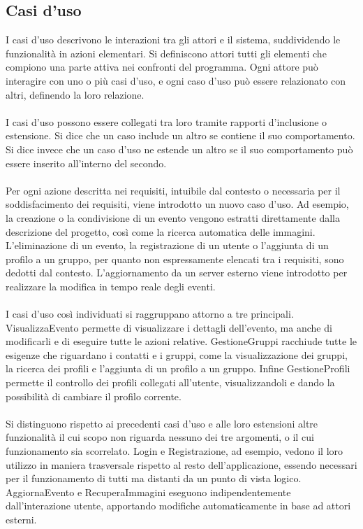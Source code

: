 \subsection{Casi d’uso}

I casi d’uso descrivono le interazioni tra gli attori e il sistema,
suddividendo le funzionalità in azioni elementari.
Si definiscono attori tutti gli elementi che compiono una parte attiva nei confronti del programma.
Ogni attore può interagire con uno o più casi d'uso,
e ogni caso d'uso può essere relazionato con altri, definendo la loro relazione.\\
\\
I casi d'uso possono essere collegati tra loro tramite rapporti d'inclusione o estensione.
Si dice che un caso include un altro se contiene il suo comportamento.
Si dice invece che un caso d'uso ne estende un altro se
il suo comportamento può essere inserito all'interno del secondo.\\
\\
Per ogni azione descritta nei requisiti, intuibile dal contesto o necessaria per il soddisfacimento dei requisiti,
viene introdotto un nuovo caso d'uso.
Ad esempio, la creazione o la condivisione di un evento
vengono estratti direttamente dalla descrizione del progetto,
così come la ricerca automatica delle immagini.
L'eliminazione di un evento, la registrazione di un utente o l'aggiunta di un profilo a un gruppo,
per quanto non espressamente elencati tra i requisiti,
sono dedotti dal contesto.
L'aggiornamento da un server esterno viene introdotto
per realizzare la modifica in tempo reale degli eventi.\\
\\
I casi d'uso così individuati si raggruppano attorno a tre principali.
VisualizzaEvento permette di visualizzare i dettagli dell'evento,
ma anche di modificarli e di eseguire tutte le azioni relative.
GestioneGruppi racchiude tutte le esigenze che riguardano i contatti e i gruppi,
come la visualizzazione dei gruppi, la ricerca dei profili e l'aggiunta di un profilo a un gruppo.
Infine GestioneProfili permette il controllo dei profili collegati all'utente,
visualizzandoli e dando la possibilità di cambiare il profilo corrente.\\
\\
Si distinguono rispetto ai precedenti casi d'uso e alle loro estensioni
altre funzionalità il cui scopo non riguarda nessuno dei tre argomenti,
o il cui funzionamento sia scorrelato.
Login e Registrazione, ad esempio,
vedono il loro utilizzo in maniera trasversale rispetto al resto dell'applicazione,
essendo necessari per il funzionamento di tutti ma distanti da un punto di vista logico.
AggiornaEvento e RecuperaImmagini eseguono indipendentemente dall'interazione utente,
apportando modifiche automaticamente in base ad attori esterni.\\

